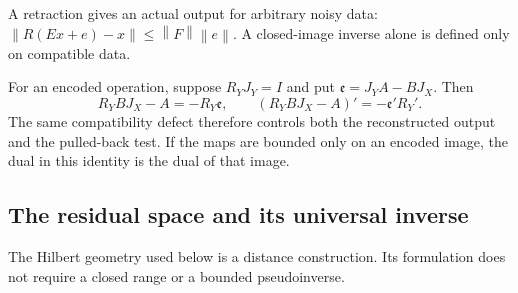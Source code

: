 \documentclass[11pt,a4paper]{amsart}
\numberwithin{equation}{section}
\theoremstyle{definition}
\theoremstyle{remark}
\newcommand{\norm}[1]{\left\lVert#1\right\rVert}
\begin{document}
A retraction gives an actual output for arbitrary noisy data: $\norm{R(Ex+e)-x}\le\norm F\norm e$. A closed-image inverse alone is defined only on compatible data.

For an encoded operation, suppose $R_YJ_Y=I$ and put $\mathfrak e=J_YA-BJ_X$. Then
\begin{equation}\label{eq:operator-defect}
 R_YBJ_X-A=-R_Y\mathfrak e,\qquad
 (R_YBJ_X-A)'=-\mathfrak e'R_Y'.
\end{equation}
The same compatibility defect therefore controls both the reconstructed output and the pulled-back test. If the maps are bounded only on an encoded image, the dual in this identity is the dual of that image.

\subsection{The residual space and its universal inverse}
The Hilbert geometry used below is a distance construction. Its formulation does not require a closed range or a bounded pseudoinverse.
\end{document}
